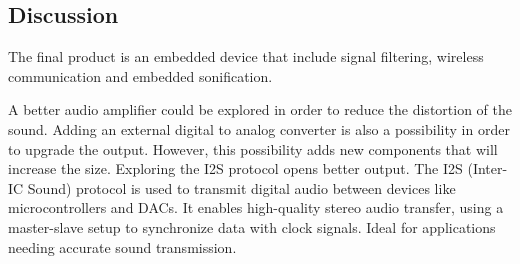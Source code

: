 




\subsection{Discussion}

The final product is an embedded device that include signal filtering, wireless communication and embedded sonification.


A better audio amplifier could be explored in order to reduce the distortion of the sound.
Adding an external digital to analog converter is also a possibility in order to upgrade the output. However, this possibility adds new components that will increase the size. Exploring the I2S protocol opens better output.
The I2S (Inter-IC Sound) protocol is used to transmit digital audio between devices like microcontrollers and DACs. It enables high-quality stereo audio transfer, using a master-slave setup to synchronize data with clock signals. Ideal for applications needing accurate sound transmission.


